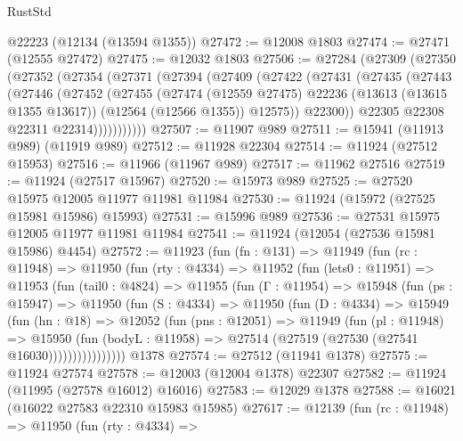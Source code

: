\begin{lexlean}{RustStd}
\begin{coremodule}
{\begin{coremodule}
{{{{{{{{{{{{{{{{{{{{{{{{{{{{{{{{{{{{{{{{{{{{{{{{{{{{{{{{{{{{{{{{{{{{{{{{{{{{{{{{    @22223
    (@12134 (@13594 @1355))
@27472 := @12008 @1803
@27474 := @27471 (@12555 @27472)
@27475 := @12032 @1803
@27506 := @27284
    (@27309
      (@27350
        (@27352
          (@27354
            (@27371
              (@27394
                (@27409
                  (@27422
                    (@27431
                      (@27435
                        (@27443
                          (@27446
                            (@27452
                              (@27455
                                (@27474
                                  (@12559 @27475)
                                  @22236
                                  (@13613 (@13615 @1355 @13617))
                                  (@12564 (@12566 @1355))
                                  @12575))
                              @22300))
                          @22305
                          @22308
                          @22311
                          @22314)))))))))))
@27507 := @11907 @989
@27511 := @15941 (@11913 @989) (@11919 @989)
@27512 := @11928 @22304
@27514 := @11924 (@27512 @15953)
@27516 := @11966 (@11967 @989)
@27517 := @11962 @27516
@27519 := @11924 (@27517 @15967)
@27520 := @15973 @989
@27525 := @27520 @15975 @12005 @11977 @11981 @11984
@27530 := @11924 (@15972 (@27525 @15981 @15986) @15993)
@27531 := @15996 @989
@27536 := @27531 @15975 @12005 @11977 @11981 @11984
@27541 := @11924 (@12054 (@27536 @15981 @15986) @4454)
@27572 := @11923
    (fun (fn : @131) =>
    @11949
      (fun (rc : @11948) =>
      @11950
        (fun (rty : @4334) =>
        @11952
          (fun (lets0 : @11951) =>
          @11953
            (fun (tail0 : @4824) =>
            @11955
              (fun (Γ : @11954) =>
              @15948
                (fun (ps : @15947) =>
                @11950
                  (fun (S : @4334) =>
                  @11950
                    (fun (D : @4334) =>
                    @15949
                      (fun (hn : @18) =>
                      @12052
                        (fun (pns : @12051) =>
                        @11949
                          (fun (pl : @11948) =>
                          @15950
                            (fun (bodyL : @11958) =>
                            @27514 (@27519 (@27530 (@27541 @16030))))))))))))))))
    @1378
@27574 := @27512 (@11941 @1378)
@27575 := @11924 @27574
@27578 := @12003 (@12004 @1378) @22307
@27582 := @11924 (@11995 (@27578 @16012) @16016)
@27583 := @12029 @1378
@27588 := @16021 (@16022 @27583 @22310 @15983 @15985)
@27617 := @12139
    (fun (rc : @11948) =>
    @11950
      (fun (rty : @4334) =>
}}}}}}}}}}}}}}}}}}}}}}}}}}}}}}}}}}}}}}}}}}}}}}}}}}}}}}}}}}}}}}}}}}}}}}}}}}}}}}}}
\end{coremodule}}
\end{coremodule}
\end{lexlean}
